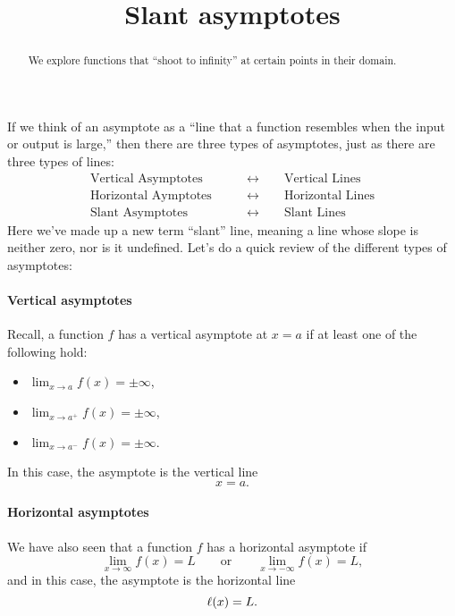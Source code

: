 \documentclass{ximera}
\title[Dig-In:]{Slant asymptotes}
\begin{document}
\begin{abstract}
We explore functions that ``shoot to infinity'' at certain points in
their domain.
\end{abstract}
\maketitle

If we think of an asymptote as a ``line that a function resembles when
the input or output is large,'' then there are three types of asymptotes, just
as there are three types of lines:
\begin{align*}
  \text{Vertical Asymptotes} \qquad&\leftrightarrow\qquad \text{Vertical Lines}\\
  \text{Horizontal Aymptotes}\qquad&\leftrightarrow\qquad \text{Horizontal Lines} \\
  \text{Slant Asymptotes}\qquad&\leftrightarrow\qquad \text{Slant Lines} 
\end{align*}
Here we've made up a new term ``slant'' line, meaning a line whose
slope is neither zero, nor is it undefined. Let's do a quick review of
the different types of asymptotes:



\paragraph{Vertical asymptotes}

Recall, a function $f$ has a vertical asymptote at $x=a$ if at least
one of the following hold:
\begin{itemize}
\item $\lim_{x\to a} f(x) = \pm\infty$,
\item $\lim_{x\to a^+} f(x) = \pm\infty$,
\item $\lim_{x\to a^-} f(x) = \pm\infty$.
\end{itemize}
In this case, the asymptote is the vertical line
\[
x = a.
\]



\paragraph{Horizontal asymptotes}

We have also seen that a function $f$ has a horizontal asymptote if
\[
\lim_{x\to \infty} f(x) = L \qquad\text{or}\qquad \lim_{x\to -\infty}
f(x) = L,
\]
and in this case, the asymptote is the horizontal line
\[
\ell(x) = L.
\]
\end{document}
